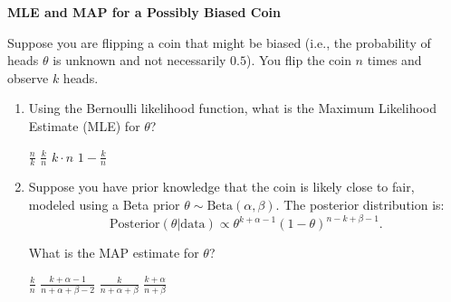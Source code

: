\documentclass[12pt,letterpaper, onecolumn]{exam}
\begin{document}
\begin{questions}
\question[10 points]\textbf{MLE and MAP for a Possibly Biased Coin}\droppoints

Suppose you are flipping a coin that might be biased (i.e., the probability of heads \( \theta \) is unknown and not necessarily \( 0.5 \)). You flip the coin \( n \) times and observe \( k \) heads.

\begin{enumerate}[label=(\alph*)]
    \item Using the Bernoulli likelihood function, what is the Maximum Likelihood Estimate (MLE) for \( \theta \)?
    \begin{choices}
        \choice \( \frac{n}{k} \)
        \choice \( \frac{k}{n} \)
        \choice \( k \cdot n \)
        \choice \( 1 - \frac{k}{n} \)
    \end{choices}
    \item Suppose you have prior knowledge that the coin is likely close to fair, modeled using a Beta prior \( \theta \sim \text{Beta}(\alpha, \beta) \). The posterior distribution is:
    \[
    \text{Posterior}(\theta | \text{data}) \propto \theta^{k + \alpha - 1} (1 - \theta)^{n - k + \beta - 1}.
    \]

    What is the MAP estimate for \( \theta \)?
    \begin{choices}
        \choice \( \frac{k}{n} \)
        \choice \( \frac{k + \alpha - 1}{n + \alpha + \beta - 2} \)
        \choice \( \frac{k}{n + \alpha + \beta} \)
        \choice \( \frac{k + \alpha}{n + \beta} \)
    \end{choices}
\end{enumerate}

\begin{solution}
    \begin{parts}
        \part 
        \part 
        \part 
        \part 
    \end{parts}
\end{solution}



\end{questions}
\end{document}
